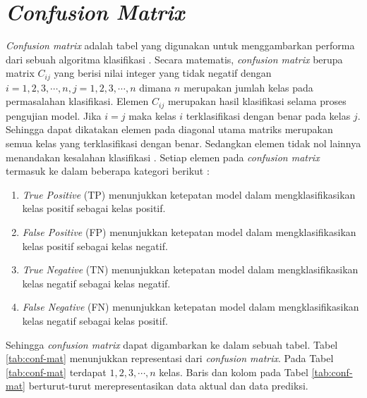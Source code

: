 \section{\textit{Confusion Matrix}}
\textit{Confusion matrix} adalah tabel yang digunakan untuk menggambarkan performa dari sebuah algoritma klasifikasi \citep{nasution2022sentiment, julianto2021performance}. Secara matematis, \textit{confusion matrix} berupa matrix $C_{ij}$ yang berisi nilai integer yang tidak negatif dengan $i=1, 2, 3, \cdots, n,j=1, 2, 3, \cdots, n$ dimana $n$ merupakan jumlah kelas pada permasalahan klasifikasi. Elemen $C_{ij}$ merupakan hasil klasifikasi selama proses pengujian model. Jika $i=j$ maka kelas $i$ terklasifikasi dengan benar pada kelas $j$. Sehingga dapat dikatakan elemen pada diagonal utama matriks merupakan semua kelas yang terklasifikasi dengan benar. Sedangkan elemen tidak nol lainnya menandakan kesalahan klasifikasi \citep{Susmaga2004}. Setiap elemen pada \textit{confusion matrix} termasuk ke dalam beberapa kategori berikut \citep{Shultz2017}:
\begin{enumerate}
    \item \textit{True Positive} (TP) menunjukkan ketepatan model dalam mengklasifikasikan kelas positif sebagai kelas positif.
    \item \textit{False Positive} (FP) menunjukkan ketepatan model dalam mengklasifikasikan kelas positif sebagai kelas negatif.
    \item \textit{True Negative} (TN) menunjukkan ketepatan model dalam mengklasifikasikan kelas negatif sebagai kelas negatif.
    \item \textit{False Negative} (FN) menunjukkan ketepatan model dalam mengklasifikasikan kelas negatif sebagai kelas positif.
\end{enumerate}

Sehingga \textit{confusion matrix} dapat digambarkan ke dalam sebuah tabel. Tabel \ref{tab:conf-mat} menunjukkan representasi dari \textit{confusion matrix}. Pada Tabel \ref{tab:conf-mat} terdapat $1, 2, 3, \cdots, n$ kelas. Baris dan kolom pada Tabel \ref{tab:conf-mat} berturut-turut merepresentasikan data aktual dan data prediksi.

